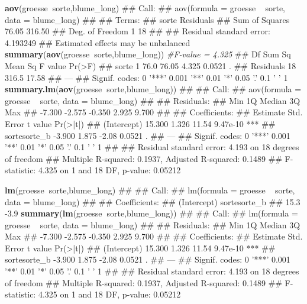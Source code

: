 \documentclass[]{book}
\newenvironment{Shaded}{\begin{snugshade}}{\end{snugshade}}
\newcommand{\KeywordTok}[1]{\textcolor[rgb]{0.13,0.29,0.53}{\textbf{#1}}}
\newcommand{\CommentTok}[1]{\textcolor[rgb]{0.56,0.35,0.01}{\textit{#1}}}
\newcommand{\OperatorTok}[1]{\textcolor[rgb]{0.81,0.36,0.00}{\textbf{#1}}}
\newcommand{\NormalTok}[1]{#1}
\begin{document}
\begin{Shaded}
\begin{Highlighting}[]
\KeywordTok{aov}\NormalTok{(groesse}\OperatorTok{~}\NormalTok{sorte,blume_long)}
\NormalTok{## Call:}
\NormalTok{##    aov(formula = groesse ~ sorte, data = blume_long)}
\NormalTok{## }
\NormalTok{## Terms:}
\NormalTok{##                  sorte Residuals}
\NormalTok{## Sum of Squares   76.05    316.50}
\NormalTok{## Deg. of Freedom      1        18}
\NormalTok{## }
\NormalTok{## Residual standard error: 4.193249}
\NormalTok{## Estimated effects may be unbalanced}
\KeywordTok{summary}\NormalTok{(}\KeywordTok{aov}\NormalTok{(groesse}\OperatorTok{~}\NormalTok{sorte,blume_long)) }\CommentTok{#F-value = 4.325}
\NormalTok{##             Df Sum Sq Mean Sq F value Pr(>F)  }
\NormalTok{## sorte        1   76.0   76.05   4.325 0.0521 .}
\NormalTok{## Residuals   18  316.5   17.58                 }
\NormalTok{## ---}
\NormalTok{## Signif. codes:  0 '***' 0.001 '**' 0.01 '*' 0.05 '.' 0.1 ' ' 1}
\KeywordTok{summary.lm}\NormalTok{(}\KeywordTok{aov}\NormalTok{(groesse}\OperatorTok{~}\NormalTok{sorte,blume_long))}
\NormalTok{## }
\NormalTok{## Call:}
\NormalTok{## aov(formula = groesse ~ sorte, data = blume_long)}
\NormalTok{## }
\NormalTok{## Residuals:}
\NormalTok{##    Min     1Q Median     3Q    Max }
\NormalTok{## -7.300 -2.575 -0.350  2.925  9.700 }
\NormalTok{## }
\NormalTok{## Coefficients:}
\NormalTok{##              Estimate Std. Error t value Pr(>|t|)    }
\NormalTok{## (Intercept)    15.300      1.326   11.54 9.47e-10 ***}
\NormalTok{## sortesorte_b   -3.900      1.875   -2.08   0.0521 .  }
\NormalTok{## ---}
\NormalTok{## Signif. codes:  0 '***' 0.001 '**' 0.01 '*' 0.05 '.' 0.1 ' ' 1}
\NormalTok{## }
\NormalTok{## Residual standard error: 4.193 on 18 degrees of freedom}
\NormalTok{## Multiple R-squared:  0.1937, Adjusted R-squared:  0.1489 }
\NormalTok{## F-statistic: 4.325 on 1 and 18 DF,  p-value: 0.05212}

\KeywordTok{lm}\NormalTok{(groesse}\OperatorTok{~}\NormalTok{sorte,blume_long)}
\NormalTok{## }
\NormalTok{## Call:}
\NormalTok{## lm(formula = groesse ~ sorte, data = blume_long)}
\NormalTok{## }
\NormalTok{## Coefficients:}
\NormalTok{##  (Intercept)  sortesorte_b  }
\NormalTok{##         15.3          -3.9}
\KeywordTok{summary}\NormalTok{(}\KeywordTok{lm}\NormalTok{(groesse}\OperatorTok{~}\NormalTok{sorte,blume_long))}
\NormalTok{## }
\NormalTok{## Call:}
\NormalTok{## lm(formula = groesse ~ sorte, data = blume_long)}
\NormalTok{## }
\NormalTok{## Residuals:}
\NormalTok{##    Min     1Q Median     3Q    Max }
\NormalTok{## -7.300 -2.575 -0.350  2.925  9.700 }
\NormalTok{## }
\NormalTok{## Coefficients:}
\NormalTok{##              Estimate Std. Error t value Pr(>|t|)    }
\NormalTok{## (Intercept)    15.300      1.326   11.54 9.47e-10 ***}
\NormalTok{## sortesorte_b   -3.900      1.875   -2.08   0.0521 .  }
\NormalTok{## ---}
\NormalTok{## Signif. codes:  0 '***' 0.001 '**' 0.01 '*' 0.05 '.' 0.1 ' ' 1}
\NormalTok{## }
\NormalTok{## Residual standard error: 4.193 on 18 degrees of freedom}
\NormalTok{## Multiple R-squared:  0.1937, Adjusted R-squared:  0.1489 }
\NormalTok{## F-statistic: 4.325 on 1 and 18 DF,  p-value: 0.05212}


\end{Highlighting}
\end{Shaded}
\end{document}
